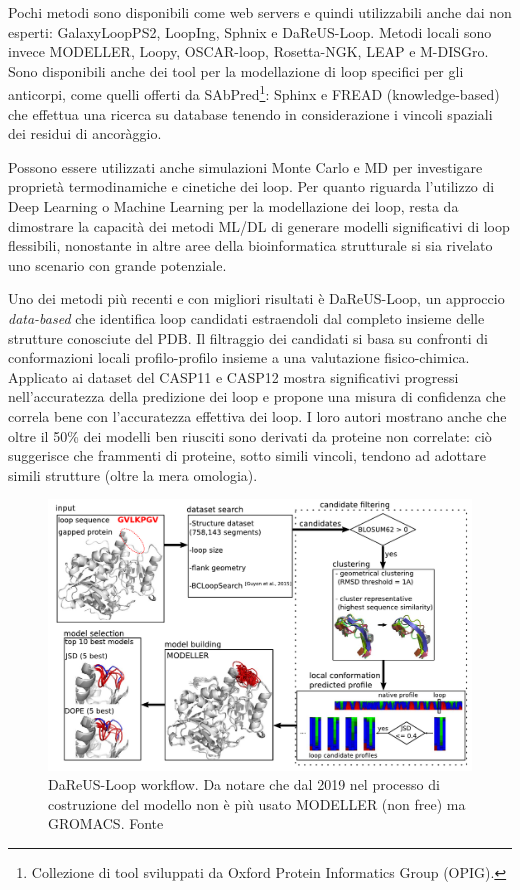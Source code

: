 {{\par Pochi metodi sono disponibili come web servers e quindi utilizzabili anche dai non esperti: GalaxyLoopPS2, LoopIng, Sphnix e DaReUS-Loop. Metodi locali sono invece MODELLER, Loopy, OSCAR-loop, Rosetta-NGK, LEAP e M-DISGro. Sono disponibili anche dei tool per la modellazione di loop specifici per gli anticorpi, come quelli offerti da SAbPred\footnote{Collezione di tool sviluppati da Oxford Protein Informatics Group (OPIG).}: Sphinx e FREAD (knowledge-based) che effettua una ricerca su database tenendo in considerazione i vincoli spaziali dei residui di ancoràggio.

\par Possono essere utilizzati anche simulazioni Monte Carlo e MD per investigare proprietà termodinamiche e cinetiche dei loop. Per quanto riguarda l'utilizzo di Deep Learning o Machine Learning per la modellazione dei loop, resta da dimostrare la capacità dei metodi ML/DL di generare modelli significativi di loop flessibili, nonostante in altre aree della bioinformatica strutturale si sia rivelato uno scenario con grande potenziale\supercite{barozet2021current}.

\par Uno dei metodi più recenti e con migliori risultati è DaReUS-Loop, un approccio  \textit{data-based} che identifica loop candidati estraendoli dal completo insieme delle strutture conosciute del PDB. Il filtraggio dei candidati si basa su confronti di conformazioni locali profilo-profilo insieme a una valutazione fisico-chimica. Applicato ai dataset del CASP11 e CASP12 mostra significativi progressi nell'accuratezza della predizione dei loop e propone una misura di confidenza che correla bene con l'accuratezza effettiva dei loop. I loro autori mostrano anche che oltre il 50\% dei modelli ben riusciti sono derivati da proteine non correlate: ciò suggerisce che frammenti di proteine, sotto simili vincoli, tendono ad adottare simili strutture (oltre la mera omologia)\supercite{karami2018dareus}. 

\begin{figure}[!htb]
	\centering
	\includegraphics[scale=0.45]{images/dareus.png}
	\caption{DaReUS-Loop workflow. Da notare che dal 2019\supercite{karamiLoop} nel processo di costruzione del modello non è più usato MODELLER (non free) ma GROMACS. Fonte\cite{karami2018dareus}}
	\label{fig:dareus-workflow}
\end{figure}

}}
